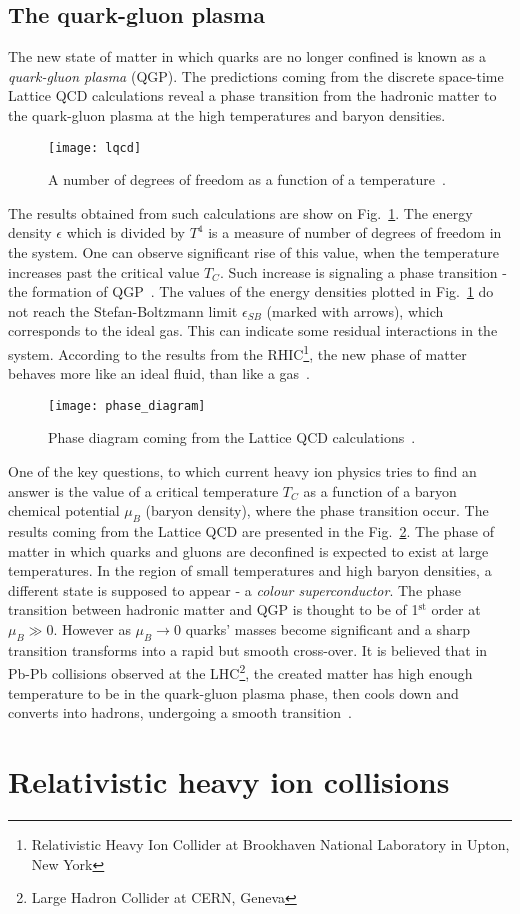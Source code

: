     \subsection{The quark-gluon plasma}
      The new state of matter in which quarks are no longer confined is known as a \textit{quark-gluon plasma} (QGP).
      The predictions coming from the discrete space-time Lattice QCD calculations reveal a phase transition from the hadronic matter to the quark-gluon plasma at the high temperatures and baryon densities.
      \begin{figure}[h]
        \centering
        \texttt{[image: lqcd]}
        \caption{A number of degrees of freedom as a function of a temperature~\cite{karsch}.}
        \label{fig:lqcd}
      \end{figure}
      The results obtained from such calculations are show on Fig.~\ref{fig:lqcd}.
      The energy density $\epsilon$ which is divided by $T^4$ is a measure of number of degrees of freedom in the system.
      One can observe significant rise of this value, when the temperature increases past the critical value $T_C$.
      Such increase is signaling a phase transition - the formation of QGP~\cite{drkisiel}.
      The values of the energy densities plotted in Fig.~\ref{fig:lqcd} do not reach the Stefan-Boltzmann limit $\epsilon_{SB}$ (marked with arrows), which corresponds to the ideal gas.
      This can indicate some residual interactions in the system.
      According to the results from the RHIC\footnote{Relativistic Heavy Ion Collider at Brookhaven National Laboratory in Upton, New York}, the new phase of matter behaves more like an ideal fluid, than like a gas~\cite{bartke}.
      \begin{figure}[h]
        \centering
        \texttt{[image: phase\_diagram]}
        \caption{Phase diagram coming from the Lattice QCD calculations~\cite{drkisiel}.}
        \label{fig:phase_diagram}
      \end{figure}

      One of the key questions, to which current heavy ion physics tries to find an answer is the value of a critical temperature $T_C$ as a function of a baryon chemical potential $\mu_B$ (baryon density), where the phase transition occur.
      The results coming from the Lattice QCD are presented in the Fig.~\ref{fig:phase_diagram}.
      The phase of matter in which quarks and gluons are deconfined is expected to exist at large temperatures.
      In the region of small temperatures and high baryon densities, a different state is supposed to appear - a \textit{colour superconductor}.
      The phase transition between hadronic matter and QGP is thought to be of 1$^\text{st}$ order at $\mu_B \gg 0$.
      However as $\mu_B \to 0$ quarks' masses become significant and a sharp transition transforms into a rapid but smooth cross-over.
      It is believed that in Pb-Pb collisions observed at the LHC\footnote{Large Hadron Collider at CERN, Geneva}, the created matter has high enough temperature to be in the quark-gluon plasma phase, then cools down and converts into hadrons, undergoing a smooth transition~\cite{drkisiel}.
  \section{Relativistic heavy ion collisions}

  
